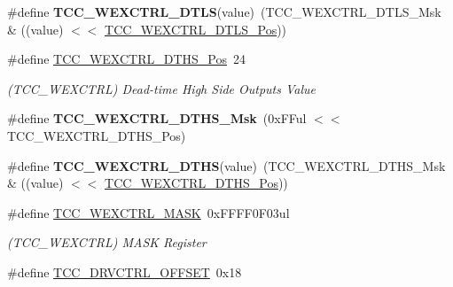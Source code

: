 \begin{DoxyCompactItemize}
\item 
\hypertarget{group___s_a_m_l21___t_c_c_ga281be3f0e9d4fc2e6c0b73d6d4f57556}{}\#define {\bfseries T\+C\+C\+\_\+\+W\+E\+X\+C\+T\+R\+L\+\_\+\+D\+T\+L\+S}(value)~(T\+C\+C\+\_\+\+W\+E\+X\+C\+T\+R\+L\+\_\+\+D\+T\+L\+S\+\_\+\+Msk \& ((value) $<$$<$ \hyperlink{group___s_a_m_l21___t_c_c_ga7a2f2a028e8575f02a20cee3184b1ddf}{T\+C\+C\+\_\+\+W\+E\+X\+C\+T\+R\+L\+\_\+\+D\+T\+L\+S\+\_\+\+Pos}))\label{group___s_a_m_l21___t_c_c_ga281be3f0e9d4fc2e6c0b73d6d4f57556}

\item 
\hypertarget{group___s_a_m_l21___t_c_c_gace6042a790003bac366162cd2877a6fe}{}\#define \hyperlink{group___s_a_m_l21___t_c_c_gace6042a790003bac366162cd2877a6fe}{T\+C\+C\+\_\+\+W\+E\+X\+C\+T\+R\+L\+\_\+\+D\+T\+H\+S\+\_\+\+Pos}~24\label{group___s_a_m_l21___t_c_c_gace6042a790003bac366162cd2877a6fe}

\begin{DoxyCompactList}\small\item\em (T\+C\+C\+\_\+\+W\+E\+X\+C\+T\+R\+L) Dead-\/time High Side Outputs Value \end{DoxyCompactList}\item 
\hypertarget{group___s_a_m_l21___t_c_c_ga8b06b9fbf18eb2c526b947434124b874}{}\#define {\bfseries T\+C\+C\+\_\+\+W\+E\+X\+C\+T\+R\+L\+\_\+\+D\+T\+H\+S\+\_\+\+Msk}~(0x\+F\+Ful $<$$<$ T\+C\+C\+\_\+\+W\+E\+X\+C\+T\+R\+L\+\_\+\+D\+T\+H\+S\+\_\+\+Pos)\label{group___s_a_m_l21___t_c_c_ga8b06b9fbf18eb2c526b947434124b874}

\item 
\hypertarget{group___s_a_m_l21___t_c_c_gaf0ee5a6eeff044dae73bb56a9c6a565f}{}\#define {\bfseries T\+C\+C\+\_\+\+W\+E\+X\+C\+T\+R\+L\+\_\+\+D\+T\+H\+S}(value)~(T\+C\+C\+\_\+\+W\+E\+X\+C\+T\+R\+L\+\_\+\+D\+T\+H\+S\+\_\+\+Msk \& ((value) $<$$<$ \hyperlink{group___s_a_m_l21___t_c_c_gace6042a790003bac366162cd2877a6fe}{T\+C\+C\+\_\+\+W\+E\+X\+C\+T\+R\+L\+\_\+\+D\+T\+H\+S\+\_\+\+Pos}))\label{group___s_a_m_l21___t_c_c_gaf0ee5a6eeff044dae73bb56a9c6a565f}

\item 
\hypertarget{group___s_a_m_l21___t_c_c_ga0e73cb33f372203331c10485c936a786}{}\#define \hyperlink{group___s_a_m_l21___t_c_c_ga0e73cb33f372203331c10485c936a786}{T\+C\+C\+\_\+\+W\+E\+X\+C\+T\+R\+L\+\_\+\+M\+A\+S\+K}~0x\+F\+F\+F\+F0\+F03ul\label{group___s_a_m_l21___t_c_c_ga0e73cb33f372203331c10485c936a786}

\begin{DoxyCompactList}\small\item\em (T\+C\+C\+\_\+\+W\+E\+X\+C\+T\+R\+L) M\+A\+S\+K Register \end{DoxyCompactList}\item 
\hypertarget{group___s_a_m_l21___t_c_c_ga57a323a0b62d2bd7a95c6ab58e149da9}{}\#define \hyperlink{group___s_a_m_l21___t_c_c_ga57a323a0b62d2bd7a95c6ab58e149da9}{T\+C\+C\+\_\+\+D\+R\+V\+C\+T\+R\+L\+\_\+\+O\+F\+F\+S\+E\+T}~0x18\label{group___s_a_m_l21___t_c_c_ga57a323a0b62d2bd7a95c6ab58e149da9}


\end{DoxyCompactItemize}
